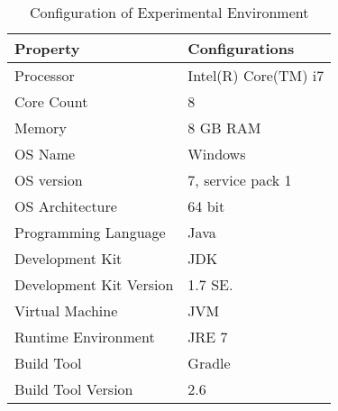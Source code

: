 %
%
\begin{table}
\centering

\begin{tabular}{|l|l|}
\hline 
	Property&Configurations\\ \hline\hline

	Processor				& Intel(R) Core(TM) i7		\\ \hline
	Core Count				& 8							\\\hline
	Memory					& 8 GB RAM 					\\\hline
	OS Name					& Windows					\\ \hline
	OS version 				& 7, service pack 1 		\\ \hline
	OS Architecture 		& 64 bit					\\ \hline
	Programming Language 	& Java						\\ \hline
	Development Kit 		& JDK						\\ \hline
	Development Kit Version & 1.7 SE.					\\\hline
	Virtual Machine 		& JVM						\\ \hline
	Runtime Environment 	& JRE 7						\\\hline
	Build Tool				& Gradle					\\\hline
	Build Tool Version		& 2.6						\\\hline
	\end{tabular}
\caption{Configuration of Experimental Environment}
\label{table:experiment_configuration}
\end{table}
%